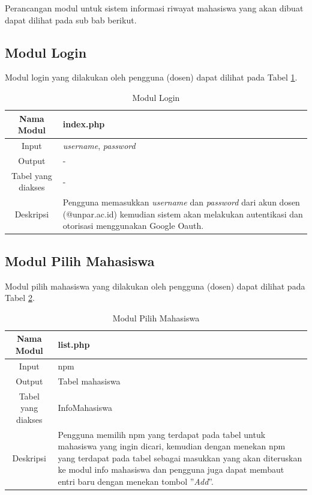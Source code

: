 Perancangan modul untuk sistem informasi riwayat mahasiswa yang akan dibuat
dapat dilihat pada sub bab berikut.

\subsection{Modul Login}
Modul login yang dilakukan oleh pengguna (dosen) dapat dilihat pada Tabel
\ref{tab:modullogin}.

\begin{table}[ht]
\centering
\caption[Tabel Modul Login]{Modul Login}
\label{tab:modullogin}
\begin{tabular}{|c|p{10cm}|}
\hline
Nama Modul & index.php\\
\hline
Input & {\it username}, {\it password}\\
\hline
Output & -\\
\hline
Tabel yang diakses & -\\
\hline
Deskripsi & Pengguna memasukkan {\it username} dan {\it password} dari akun dosen (@unpar.ac.id) kemudian sistem akan melakukan autentikasi dan otorisasi menggunakan Google Oauth.\\
\hline
\end{tabular}
\end{table}

\subsection{Modul Pilih Mahasiswa}
Modul pilih mahasiswa yang dilakukan oleh pengguna (dosen) dapat dilihat pada
Tabel \ref{tab:modulpilihmahasiswa}.

\begin{table}[ht]
\centering
\caption[Tabel Modul Pilih Mahasiswa]{Modul Pilih Mahasiswa}
\label{tab:modulpilihmahasiswa}
\begin{tabular}{|c|p{10cm}|}
\hline
Nama Modul & list.php\\
\hline
Input & npm\\
\hline
Output & Tabel mahasiswa\\
\hline
Tabel yang diakses & InfoMahasiswa\\
\hline
Deskripsi & Pengguna memilih npm yang terdapat pada tabel untuk mahasiswa yang ingin dicari, kemudian dengan menekan npm yang terdapat pada tabel sebagai masukkan yang akan diteruskan ke modul info mahasiswa dan pengguna juga dapat membaut entri baru dengan menekan tombol ''{\it Add}''.\\
\hline
\end{tabular}
\end{table}

